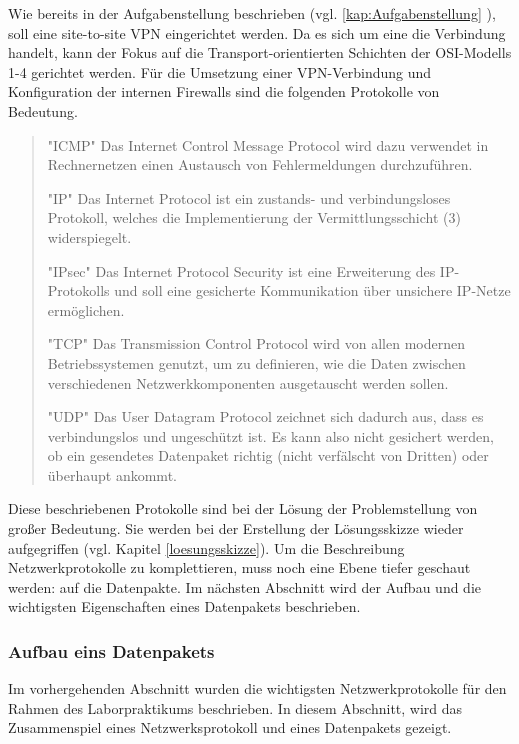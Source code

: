\documentclass[
a4paper,     %
 headsepline, %
footsepline, %
titlepage,   %
 halfparskip,     %
 fleqn,       %
12pt         %
]{scrartcl}  %
\begin{document}
Wie bereits in der Aufgabenstellung beschrieben (vgl. \ref{kap:Aufgabenstellung} ), soll eine site-to-site VPN eingerichtet werden. Da es sich um eine die Verbindung handelt, kann der Fokus auf die Transport-orientierten Schichten der OSI-Modells 1-4 gerichtet werden. Für die Umsetzung einer VPN-Verbindung und Konfiguration der internen Firewalls sind die folgenden Protokolle von  Bedeutung. 
\begin{quotation}
\item ["ICMP"] Das Internet Control Message Protocol wird dazu verwendet in Rechnernetzen einen Austausch von Fehlermeldungen durchzuführen. 
\item ["IP"] Das Internet Protocol ist ein zustands- und verbindungsloses Protokoll, welches die Implementierung der Vermittlungsschicht (3) widerspiegelt. 
\item ["IPsec"] Das Internet Protocol Security ist eine Erweiterung des IP-Protokolls und soll eine gesicherte Kommunikation über unsichere IP-Netze ermöglichen.  
\item ["TCP"] Das Transmission Control Protocol wird von allen modernen Betriebssystemen genutzt, um zu definieren, wie die Daten zwischen verschiedenen Netzwerkkomponenten ausgetauscht werden sollen. 
\item ["UDP"] Das User Datagram Protocol zeichnet sich dadurch aus, dass es verbindungslos und ungeschützt ist. Es kann also nicht gesichert werden, ob ein gesendetes Datenpaket richtig (nicht verfälscht von Dritten) oder überhaupt ankommt. \cite{Kurose2008Computernetzwerke}
\end{quotation}
Diese beschriebenen Protokolle sind bei der Lösung der Problemstellung von großer Bedeutung. Sie werden bei der Erstellung der Lösungsskizze wieder aufgegriffen (vgl. Kapitel \ref{loesungsskizze}). Um die Beschreibung Netzwerkprotokolle zu komplettieren, muss noch eine Ebene tiefer geschaut werden: auf die Datenpakte. Im nächsten Abschnitt wird der Aufbau und die wichtigsten Eigenschaften eines Datenpakets beschrieben. 

\subsubsection{Aufbau eins Datenpakets}
Im vorhergehenden Abschnitt wurden die wichtigsten Netzwerkprotokolle für den Rahmen des Laborpraktikums beschrieben. In diesem Abschnitt, wird das Zusammenspiel eines Netzwerksprotokoll und eines Datenpakets gezeigt. 
 
\end{document}
